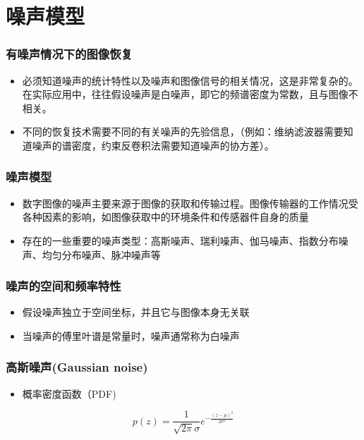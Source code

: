 \documentclass{beamer}
\begin{document}
\section{噪声模型}
\label{sec-3}
\begin{frame}
\frametitle{有噪声情况下的图像恢复}
\label{sec-3-1}

\begin{itemize}
\item 必须知道噪声的统计特性以及噪声和图像信号的相关情况，这是非常复杂的。在实际应用中，往往假设噪声是白噪声，即它的频谱密度为常数，且与图像不相关。
\item 不同的恢复技术需要不同的有关噪声的先验信息，（例如：维纳滤波器需要知道噪声的谱密度，约束反卷积法需要知道噪声的协方差）。
\end{itemize}
\end{frame}
\begin{frame}
\frametitle{噪声模型}
\label{sec-3-2}

\begin{itemize}
\item 数字图像的噪声主要来源于图像的获取和传输过程。图像传输器的工作情况受各种因素的影响，如图像获取中的环境条件和传感器件自身的质量
\item 存在的一些重要的噪声类型：高斯噪声、瑞利噪声、伽马噪声、指数分布噪声、均匀分布噪声、脉冲噪声等
\end{itemize}
\end{frame}
\begin{frame}
\frametitle{噪声的空间和频率特性}
\label{sec-3-3}

\begin{itemize}
\item 假设噪声独立于空间坐标，并且它与图像本身无关联
\item 当噪声的傅里叶谱是常量时，噪声通常称为白噪声
\end{itemize}
\end{frame}
\begin{frame}
\frametitle{高斯噪声(Gaussian noise)}
\label{sec-3-4}

\begin{itemize}
\item 概率密度函数（PDF)
\end{itemize}
\[p(z)=\frac{1}{\sqrt{2\pi}\sigma}e^{-\frac{(z-\mu)^2}{2\sigma^2}}  \]
\end{frame}
\end{document}
